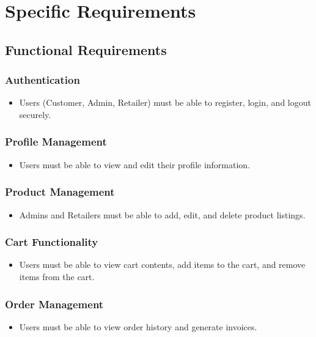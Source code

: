 \documentclass{article}
\begin{document}
\section{Specific Requirements}
\subsection{Functional Requirements}
\subsubsection{Authentication}
\begin{itemize}[label=-]
    \item Users (Customer, Admin, Retailer) must be able to register, login, and logout securely.
\end{itemize}

\subsubsection{Profile Management}
\begin{itemize}[label=-]
    \item Users must be able to view and edit their profile information.
\end{itemize}

\subsubsection{Product Management}
\begin{itemize}[label=-]
    \item Admins and Retailers must be able to add, edit, and delete product listings.
\end{itemize}

\subsubsection{Cart Functionality}
\begin{itemize}[label=-]
    \item Users must be able to view cart contents, add items to the cart, and remove items from the cart.
\end{itemize}

\subsubsection{Order Management}
\begin{itemize}[label=-]
    \item Users must be able to view order history and generate invoices.
\end{itemize}
\end{document}
